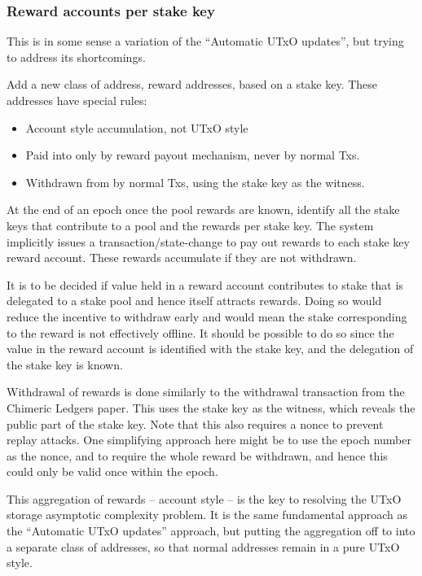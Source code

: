 \documentclass[11pt,a4paper]{article}
\begin{document}
\subsubsection{Reward accounts per stake
key}\label{reward-accounts-per-stake-key}

This is in some sense a variation of the ``Automatic UTxO updates'', but
trying to address its shortcomings.

Add a new class of address, reward addresses, based on a stake key.
These addresses have special rules:

\begin{itemize}
\item
  Account style accumulation, not UTxO style
\item
  Paid into only by reward payout mechanism, never by normal Txs.
\item
  Withdrawn from by normal Txs, using the stake key as the witness.
\end{itemize}

At the end of an epoch once the pool rewards are known, identify all the
stake keys that contribute to a pool and the rewards per stake key. The
system implicitly issues a transaction/state-change to pay out rewards
to each stake key reward account. These rewards accumulate if they are
not withdrawn.

It is to be decided if value held in a reward account contributes to
stake that is delegated to a stake pool and hence itself attracts
rewards. Doing so would reduce the incentive to withdraw early and would
mean the stake corresponding to the reward is not effectively offline.
It should be possible to do so since the value in the reward account is
identified with the stake key, and the delegation of the stake key is
known.

Withdrawal of rewards is done similarly to the withdrawal transaction
from the Chimeric Ledgers paper. This uses the stake key as the witness,
which reveals the public part of the stake key. Note that this also
requires a nonce to prevent replay attacks. One simplifying approach
here might be to use the epoch number as the nonce, and to require the
whole reward be withdrawn, and hence this could only be valid once
within the epoch.

This aggregation of rewards -- account style -- is the key to resolving
the UTxO storage asymptotic complexity problem. It is the same
fundamental approach as the ``Automatic UTxO updates'' approach, but
putting the aggregation off to into a separate class of addresses, so
that normal addresses remain in a pure UTxO style.
\end{document}
